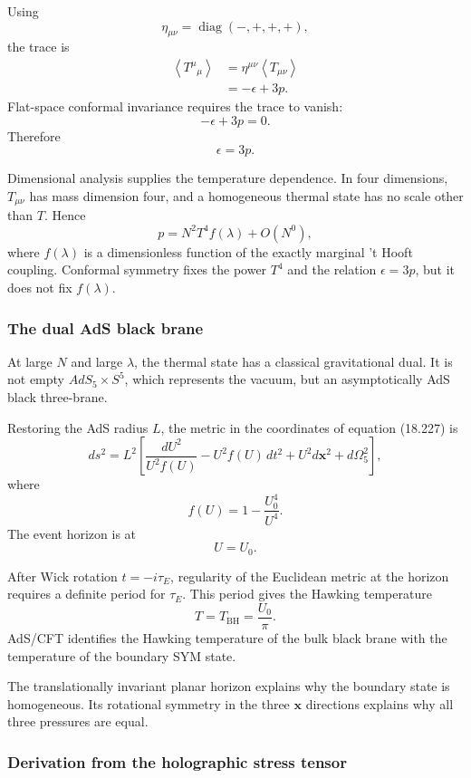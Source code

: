\documentclass[
  10pt,
  a4paper,
  openany]{book}
\begin{document}
Using \[
\eta_{\mu\nu}
=\operatorname{diag}(-,+,+,+),
\] the trace is \[
\begin{aligned}
\left\langle T^\mu{}_\mu\right\rangle
&=
\eta^{\mu\nu}
\left\langle T_{\mu\nu}\right\rangle\\
&=
-\epsilon+3p.
\end{aligned}
\] Flat-space conformal invariance requires the trace to vanish: \[
-\epsilon+3p=0.
\] Therefore \[
\boxed{
\epsilon=3p
}.
\]

Dimensional analysis supplies the temperature dependence. In four
dimensions, \(T_{\mu\nu}\) has mass dimension four, and a homogeneous
thermal state has no scale other than \(T\). Hence \[
p
=N^2T^4f(\lambda)
+O(N^0),
\] where \(f(\lambda)\) is a dimensionless function of the exactly
marginal 't Hooft coupling. Conformal symmetry fixes the power \(T^4\)
and the relation \(\epsilon=3p\), but it does not fix \(f(\lambda)\).

\subsubsection{The dual AdS black brane}\label{the-dual-ads-black-brane}

At large \(N\) and large \(\lambda\), the thermal state has a classical
gravitational dual. It is not empty \(AdS_5\times S^5\), which
represents the vacuum, but an asymptotically AdS black three-brane.

Restoring the AdS radius \(L\), the metric in the coordinates of
equation (18.227) is \[
ds^2
=L^2
\left[
\frac{dU^2}{U^2f(U)}
-U^2f(U)\,dt^2
+U^2d\mathbf x^2
+d\Omega_5^2
\right],
\] where \[
f(U)=1-\frac{U_0^4}{U^4}.
\] The event horizon is at \[
U=U_0.
\]

After Wick rotation \(t=-i\tau_E\), regularity of the Euclidean metric
at the horizon requires a definite period for \(\tau_E\). This period
gives the Hawking temperature \[
\boxed{
T=T_{\mathrm{BH}}=\frac{U_0}{\pi}
}.
\] AdS/CFT identifies the Hawking temperature of the bulk black brane
with the temperature of the boundary SYM state.

The translationally invariant planar horizon explains why the boundary
state is homogeneous. Its rotational symmetry in the three \(\mathbf x\)
directions explains why all three pressures are equal.

\subsubsection{Derivation from the holographic stress
tensor}\label{derivation-from-the-holographic-stress-tensor}
\end{document}
